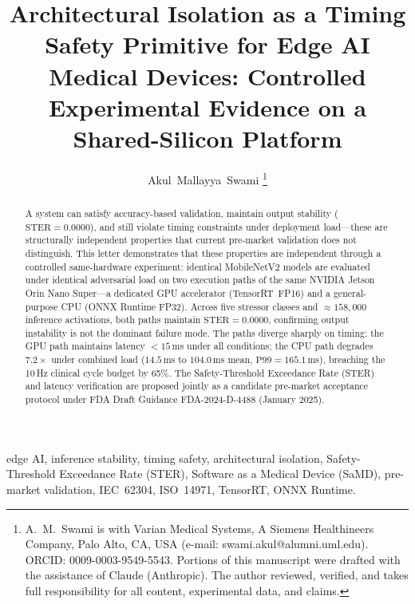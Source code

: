 \documentclass[journal,10pt,twocolumn]{IEEEtran}
\begin{document}
\title{Architectural Isolation as a Timing Safety Primitive for Edge AI
Medical Devices: Controlled Experimental Evidence on a Shared-Silicon Platform}

\author{Akul~Mallayya~Swami%
  \thanks{A.~M.~Swami is with Varian Medical Systems, A Siemens
  Healthineers Company, Palo Alto, CA, USA
  (e-mail: swami.akul@alumni.uml.edu).
  ORCID: 0009-0003-9549-5543.
  Portions of this manuscript were drafted with the assistance of Claude
  (Anthropic). The author reviewed, verified, and takes full responsibility
  for all content, experimental data, and claims.}}

\maketitle

\begin{abstract}
A system can satisfy accuracy-based validation, maintain output stability
($\mathrm{STER}{=}0.0000$), and still violate timing constraints under
deployment load---these are structurally independent properties that
current pre-market validation does not distinguish.
This letter demonstrates that these properties are independent through a controlled
same-hardware experiment: identical MobileNetV2 models are evaluated
under identical adversarial load on two execution paths of the same
NVIDIA Jetson Orin Nano Super---a dedicated GPU accelerator
(TensorRT~FP16) and a general-purpose CPU (ONNX Runtime FP32).
Across five stressor classes and ${\approx}158{,}000$ inference
activations, both paths maintain $\mathrm{STER}{=}0.0000$, confirming
output instability is not the dominant failure mode.
The paths diverge sharply on timing: the GPU path maintains latency
${<}15$\,ms under all conditions; the CPU path degrades $7.2{\times}$
under combined load ($14.5$\,ms to $104.0$\,ms mean,
$\mathrm{P99}{=}165.1$\,ms), breaching the 10\,Hz clinical cycle budget
by 65\%.
The Safety-Threshold Exceedance Rate (STER) and latency verification
are proposed jointly as a candidate pre-market acceptance protocol
under FDA Draft Guidance FDA-2024-D-4488 (January 2025).
\end{abstract}

\begin{IEEEkeywords}
edge AI, inference stability, timing safety, architectural isolation,
Safety-Threshold Exceedance Rate (STER), Software as a Medical Device
(SaMD), pre-market validation, IEC~62304, ISO~14971, TensorRT,
ONNX Runtime.
\end{IEEEkeywords}
\end{document}
